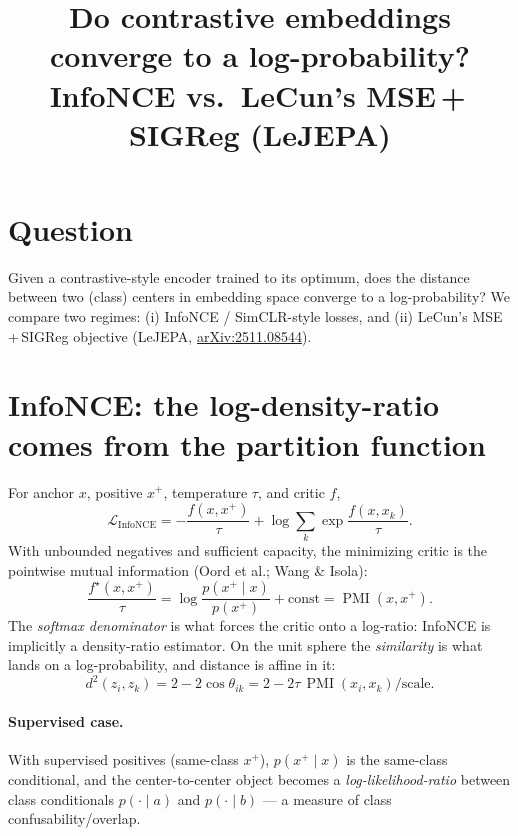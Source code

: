 \documentclass[11pt]{article}
\title{Do contrastive embeddings converge to a log-probability?\\
\large InfoNCE vs.\ LeCun's MSE\,+\,SIGReg (LeJEPA)}
\author{}
\date{}
\begin{document}
\maketitle

\section{Question}
Given a contrastive-style encoder trained to its optimum, does the distance
between two (class) centers in embedding space converge to a log-probability?
We compare two regimes: (i) InfoNCE / SimCLR-style losses, and (ii) LeCun's
MSE\,+\,SIGReg objective (LeJEPA,
\href{https://arxiv.org/abs/2511.08544}{arXiv:2511.08544}).

\section{InfoNCE: the log-density-ratio comes from the partition function}
For anchor $x$, positive $x^+$, temperature $\tau$, and critic $f$,
\begin{equation}
\mathcal{L}_{\mathrm{InfoNCE}}
= -\frac{f(x,x^+)}{\tau}
+ \log\sum_{k}\exp\!\frac{f(x,x_k)}{\tau}.
\end{equation}
With unbounded negatives and sufficient capacity, the minimizing critic is the
pointwise mutual information (Oord et al.; Wang \& Isola):
\begin{equation}
\frac{f^\star(x,x^+)}{\tau}
= \log\frac{p(x^+\mid x)}{p(x^+)} + \text{const}
= \operatorname{PMI}(x,x^+).
\label{eq:pmi}
\end{equation}
The \emph{softmax denominator} is what forces the critic onto a log-ratio:
InfoNCE is implicitly a density-ratio estimator. On the unit sphere the
\emph{similarity} is what lands on a log-probability, and distance is affine in
it:
\begin{equation}
d^2(z_i,z_k) = 2 - 2\cos\theta_{ik}
= 2 - 2\tau\,\operatorname{PMI}(x_i,x_k)/\text{scale}.
\end{equation}

\paragraph{Supervised case.}
With supervised positives (same-class $x^+$), $p(x^+\mid x)$ is the same-class
conditional, and the center-to-center object becomes a
\emph{log-likelihood-ratio} between class conditionals $p(\cdot\mid a)$ and
$p(\cdot\mid b)$ --- a measure of class confusability/overlap.
\end{document}
